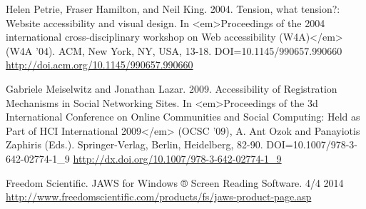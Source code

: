 \documentclass[conference]{IEEEtran}
\begin{document}
\begin{thebibliography}{1}
Helen Petrie, Fraser Hamilton, and Neil King. 2004. Tension, what tension?:
Website accessibility and visual design. In <em>Proceedings of the 2004
international cross-disciplinary workshop on Web accessibility (W4A)</em> (W4A
'04). ACM, New York, NY, USA, 13-18. DOI=10.1145/990657.990660
\href{http://doi.acm.org/10.1145/990657.990660}{http://doi.acm.org/10.1145/990657.990660}

Gabriele Meiselwitz and Jonathan Lazar. 2009. Accessibility of Registration
Mechanisms in Social Networking Sites. In <em>Proceedings of the 3d
International Conference on Online Communities and Social Computing: Held as
Part of HCI International 2009</em> (OCSC '09), A. Ant Ozok and Panayiotis
Zaphiris (Eds.). Springer-Verlag, Berlin, Heidelberg, 82-90.
DOI=10.1007/978-3-642-02774-1\_9 \href{http://dx.doi.org/10.1007/978-3-642-02774-1\_9}{http://dx.doi.org/10.1007/978-3-642-02774-1\_9}

Freedom Scientific. JAWS for Windows ® Screen Reading Software. 4/4 2014
\href{http://www.freedomscientific.com/products/fs/jaws-product-page.asp}{http://www.freedomscientific.com/products/fs/jaws-product-page.asp }


\end{thebibliography}
\end{document}
